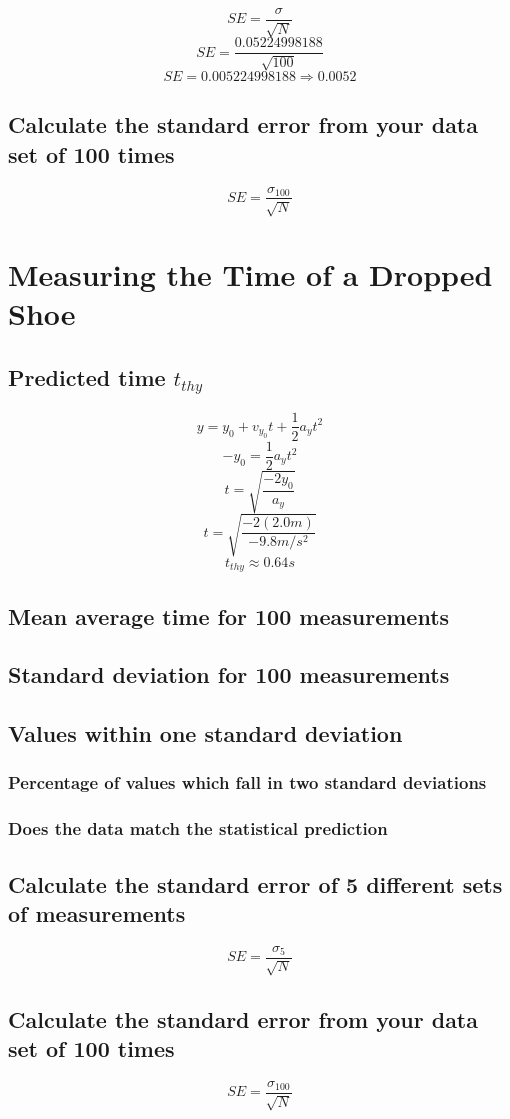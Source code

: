 \documentclass[11pt, letterpaper, includehead]{article}
\begin{document}
$$SE = \frac{\sigma}{\sqrt{N}}$$
$$SE = \frac{0.05224998188}{\sqrt{100}}$$
$$SE = 0.005224998188 \Rightarrow \boxed{0.0052}$$

\subsection{Calculate the standard error from your data set of 100 times}

$$SE = \frac{\sigma_{100}}{\sqrt{N}}$$\pagebreak


\section{Measuring the Time of a Dropped Shoe}

\subsection{Predicted time $t_{thy}$} %
$$y       = y_0 + v_{y_0}t + \frac{1}{2}a_yt^2$$
$$-y_0    = \frac{1}{2}a_yt^2$$
$$t       = \sqrt{\frac{-2y_0}{a_y}}$$
$$t       = \sqrt{\frac{-2(2.0m)}{-9.8m/s^2}}$$
$$\boxed{t_{thy}\approx 0.64s}$$

\setcounter{subsection}{3} %
\subsection{Mean average time for 100 measurements} %

\subsection{Standard deviation for 100 measurements} %

\subsection{Values within one standard deviation} %

\subsubsection{Percentage of values which fall in two standard deviations}

\subsubsection{Does the data match the statistical prediction}

\subsection{Calculate the standard error of 5 different sets of measurements}

$$SE = \frac{\sigma_{5}}{\sqrt{N}}$$


\subsection{Calculate the standard error from your data set of 100 times}


$$SE = \frac{\sigma_{100}}{\sqrt{N}}$$
\end{document}
